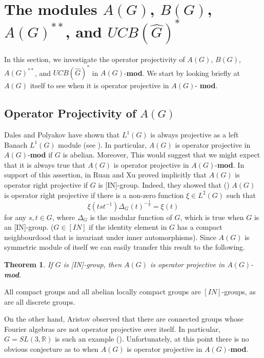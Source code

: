 \documentclass[10pt]{amsart}
\newtheorem{thm}{Theorem}
\numberwithin{thm}{section}
\numberwithin{equation}{section}
\begin{document}
\section{The modules $A(G)$, $B(G)$, $A(G)^{**}$, and $UCB(\widehat{G})^*$}

In this section, we investigate the operator projectivity of $A(G)$, $B(G)$, $A(G)^{**}$, and 
$UCB(\widehat{G})^*$ in $A(G)$-{\bf mod}. We start by looking briefly at $A(G)$ itself to see 
when it is operator projective in $A(G)$-\textbf{ mod}. 

\subsection{Operator Projectivity of $A(G)$}

Dales and Polyakov have shown that $L^{1}(G)$ is always projective as a left Banach $L^{1}(G)$ module
 (see \cite[Theorem 2.4]{DP04}). In particular, $A(G)$ is operator projective in $A(G)$-{\bf mod} if $G$ is abelian. Moreover, 
This would suggest that we might expect that it is always true that $A(G)$ is operator projective in $A(G)$-{\bf mod}. 
In support of this assertion, in \cite{RX97} Ruan and Xu proved implicitly that $A(G)$ is operator right projective if $G$ is [IN]-group.
Indeed, they showed that (\cite[Lemma 3.2]{RX97}) $A(G)$ is operator right projective if 
there is a non-zero function $\xi \in L^2(G)$ such that
	$$\xi(tst^{-1})\Delta_G(t)^{-\frac{1}{2}} = \xi(t)$$
for any $s,t\in G$, where $\Delta_G$ is the modular function of $G$, which is true when $G$ is 
an [IN]-group. ($G\in [IN]$ if the identity element in $G$ has a compact neighbourdood that is 
invariant under inner automorphisms). 
Since $A(G)$ is symmetric module of itself we can easily transfer this result to the following.

	\begin{thm}
	If $G$ is [IN]-group, then $A(G)$ is operator projective in $A(G)$-{\bf mod}.
	\end{thm}

All compact groups and all abelian locally compact groups are $[IN]$-groups, as are all discrete groups. 

On the other hand, Aristov observed that there are connected groups whose Fourier algebras are not operator projective over itself.
In particular, $G = SL(3,\mathbb{R})$ is such an example (\cite{Ar05}). Unfortunately, at this point there is no obvious conjecture
as to when $A(G)$ is operator projective in $A(G)$-{\bf mod}. 
\end{document}
